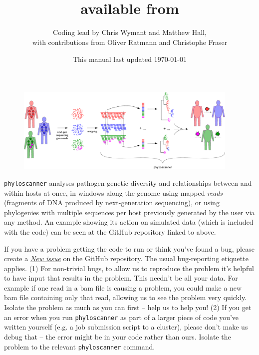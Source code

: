 \documentclass{article}
\title{\p\\available from \href{https://github.com/BDI-pathogens/phyloscanner}{\www{github.com/BDI-pathogens/phyloscanner}}}
\date{This manual last updated \today}
\author{Coding lead by Chris Wymant and Matthew Hall,\\with contributions from Oliver Ratmann and Christophe Fraser}
\newcommand{\p}{\texttt{phyloscanner}\xspace}
\newcommand{\www}{\color{blue} \underline}
\begin{document}
\maketitle


\begin{figure}[!h]
\centering
\includegraphics[width=0.95\textwidth]{PhyloscannerDiagram_big4.pdf}
\end{figure}

\vspace*{10mm}

\p analyses pathogen genetic diversity and relationships between and within hosts at once, in windows along the genome using mapped {\it reads} (fragments of DNA produced by next-generation sequencing), or using phylogenies with multiple sequences per host previously generated by the user via any method.
An example showing its action on simulated data (which is included with the code) can be seen at the GitHub repository linked to above.

\vspace*{10mm}

If you have a problem getting the code to run or think you've found a bug, please create a \href{https://github.com/BDI-pathogens/phyloscanner/issues}{\www{\it New issue}} on the GitHub repository.
The usual bug-reporting etiquette applies.
(1) For non-trivial bugs, to allow us to reproduce the problem it's helpful to have input that results in the problem.
This needn't be all your data.
For example if one read in a bam file is causing a problem, you could make a new bam file containing only that read, allowing us to see the problem very quickly.
Isolate the problem as much as you can first -- help us to help you!
(2) If you get an error when you run \p as part of a larger piece of code you've written yourself (e.g. a job submission script to a cluster), please don't make us debug that -- the error might be in your code rather than ours.
Isolate the problem to the relevant \p command.  

\newpage
\tableofcontents



\end{document}
